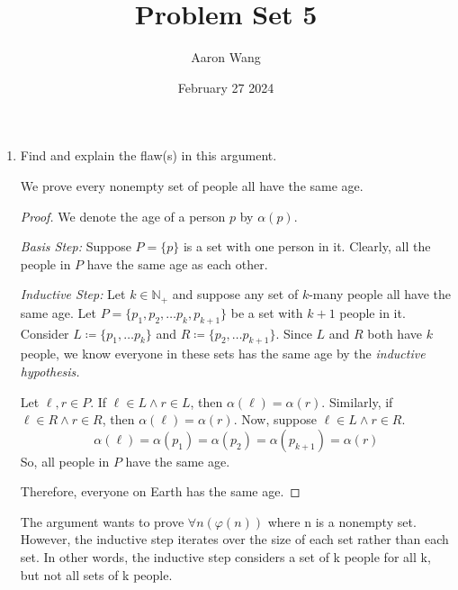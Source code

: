 \documentclass{article}
\title{Problem Set 5}
\author{Aaron Wang}
\date{February 27 2024}
\newcommand{\intersect}{\cap\:}
\newcommand{\defeq}{\coloneqq}
\newcommand{\naturals}{\mathbb{N}}
\newenvironment{case}[1][Case]
    {\par\textit{#1:}\hfill\break}
    {}
\begin{document}
\maketitle

\begin{enumerate}
    \item Find and explain the flaw(s) in this argument.
    \begin{mdframed}
      We prove every nonempty set of people all have the same age.
      \begin{proof}
        We denote the age of a person $p$ by $\alpha(p)$.
        \begin{case}[Basis Step]
          Suppose $P = \{p\}$ is a set with one person in it.
          Clearly, all the people in $P$ have the same age as each other.
        \end{case}
        
        \begin{case}[Inductive Step]
          Let $k \in \naturals_+$ and suppose any set of $k$-many people all have the same age.
          Let $P = \{p_1, p_2, \dots p_k, p_{k + 1}\}$ be a set with $k + 1$ people in it.
          Consider $L \defeq \{p_1, \dots p_k\}$ and $R \defeq \{p_2, \dots p_{k + 1}\}$.
          Since $L$ and $R$ both have $k$ people, we know everyone in these sets has the same age by the \emph{inductive hypothesis.}

          Let $\ell, r \in P$.
          If $\ell \in L \land r \in L$, then $\alpha(\ell) = \alpha(r)$.
          Similarly, if $\ell \in R \land r \in R$, then $\alpha(\ell) = \alpha(r)$.
          Now, suppose $\ell \in L \land r \in R$.
          \begin{equation*}
            \alpha(\ell) = \alpha(p_1) = \alpha(p_2) = \alpha(p_{k + 1}) = \alpha(r)
          \end{equation*}
          So, all people in $P$ have the same age.
        \end{case}

        Therefore, everyone on Earth has the same age.
      \end{proof}
    \end{mdframed}
    The argument wants to prove $\forall n (\varphi(n))$ where n is a nonempty set. However, the inductive step iterates over the size of each set rather than each set. In other words, the inductive step considers a set of k people for all k, but not all sets of k people.


\end{enumerate}
\end{document}
